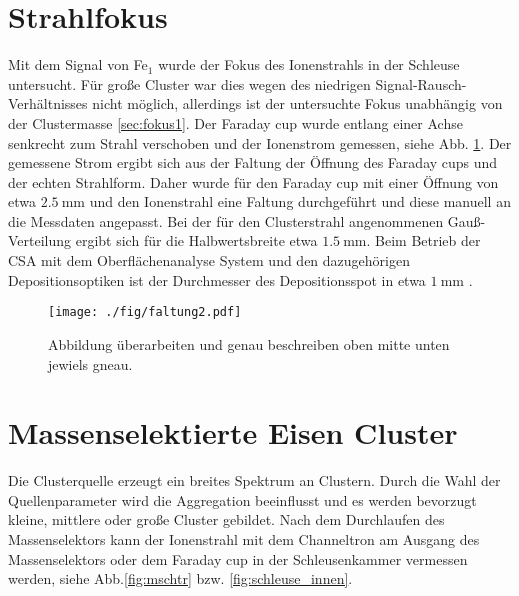 \section{Strahlfokus}
Mit dem  Signal von Fe$_1$ wurde der Fokus des Ionenstrahls in der Schleuse untersucht.
Für große Cluster war dies wegen des niedrigen Signal-Rausch-Verhältnisses nicht möglich, allerdings ist der untersuchte Fokus unabhängig von der Clustermasse \ref{sec:fokus1}.
Der Faraday cup wurde entlang einer Achse senkrecht zum Strahl verschoben und der Ionenstrom gemessen, siehe Abb. \ref{fig:faltung}.
Der gemessene Strom ergibt sich aus der Faltung der Öffnung des Faraday cups und der echten Strahlform.
Daher wurde für den Faraday cup mit einer Öffnung von etwa $\SI{2.5}{\mm}$ und den Ionenstrahl eine Faltung durchgeführt und diese manuell an die Messdaten angepasst.
Bei der für den Clusterstrahl angenommenen Gauß-Verteilung ergibt sich für die Halbwertsbreite etwa $\SI{1.5}{\mm}$.
Beim Betrieb der CSA mit dem Oberflächenanalyse System und den dazugehörigen Depositionsoptiken ist der Durchmesser des Depositionsspot in etwa $\SI{1}{\mm}$ \cite[S. 40]{gronhagen}.

\begin{figure}
    \centering
    \texttt{[image: ./fig/faltung2.pdf]}
    \caption{Abbildung überarbeiten und genau beschreiben oben mitte unten jewiels gneau.}
    \label{fig:faltung}
\end{figure}


\section{Massenselektierte Eisen Cluster}
Die Clusterquelle erzeugt ein breites Spektrum an Clustern.
Durch die Wahl der Quellenparameter wird die Aggregation beeinflusst und es werden bevorzugt kleine, mittlere oder große Cluster gebildet.
Nach dem Durchlaufen des Massenselektors kann der Ionenstrahl mit dem Channeltron am Ausgang des Massenselektors oder dem Faraday cup in der Schleusenkammer vermessen werden, siehe Abb.\ref{fig:mschtr} bzw. \ref{fig:schleuse_innen}.


